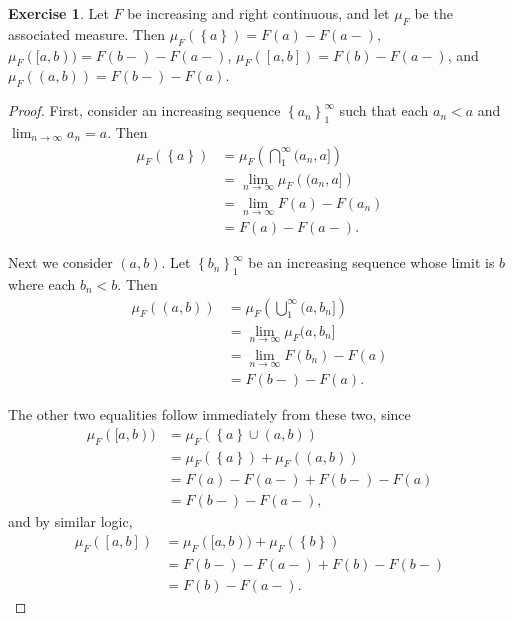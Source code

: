 \documentclass{article}
\theoremstyle{definition}
\newtheorem{ex}{Exercise}
\begin{document}
\begin{ex}
	Let $F$ be increasing and right continuous, and let $\mu_F$ be the associated measure.
	Then $\mu_F(\left\lbrace a \right\rbrace) = F(a) - F(a-)$, $\mu_F([a, b)) = F(b-) - F(a-)$, $\mu_F([a, b]) = F(b) - F(a-)$, and $\mu_F((a, b)) = F(b-) - F(a)$.
\end{ex}
\begin{proof}
	First, consider an increasing sequence $\left\lbrace a_n \right\rbrace_1^\infty$ such that each $a_n < a$ and $\lim_{n \to \infty} a_n = a$.
	Then \begin{align*}
		\mu_F(\left\lbrace a \right\rbrace) & =  \mu_F \left( \bigcap_1^\infty (a_n, a] \right)   \\
		                                    & = \lim_{n \to \infty} \mu_F \left( (a_n, a] \right) \\
		                                    & = \lim_{n \to \infty} F(a) - F(a_n)                 \\
		                                    & = F(a) - F(a-).
	\end{align*}

	Next we consider $(a, b)$.
	Let $\left\lbrace b_n \right\rbrace_1^\infty$ be an increasing sequence whose limit is $b$ where each $b_n < b$.
	Then \begin{align*}
		\mu_F((a, b)) & = \mu_F \left( \bigcup_1^\infty (a, b_n] \right) \\
		              & = \lim_{n \to \infty} \mu_F(a, b_n]              \\
		              & = \lim_{n \to \infty} F(b_n) - F(a)              \\
		              & = F(b-) - F(a).
	\end{align*}

	The other two equalities follow immediately from these two, since \begin{align*}
		\mu_F([a, b)) & = \mu_F(\left\lbrace a \right\rbrace \cup (a, b))     \\
		              & = \mu_F(\left\lbrace a \right\rbrace) + \mu_F((a, b)) \\
		              & = F(a) - F(a-) + F(b-) - F(a)                         \\
		              & = F(b-) - F(a-),
	\end{align*}
	and by similar logic, \begin{align*}
		\mu_F([a, b]) & = \mu_F([a, b)) + \mu_F(\left\lbrace b \right\rbrace) \\
		              & = F(b-) - F(a-) + F(b) - F(b-)                        \\
		              & = F(b) - F(a-).
	\end{align*}
\end{proof}
\end{document}
